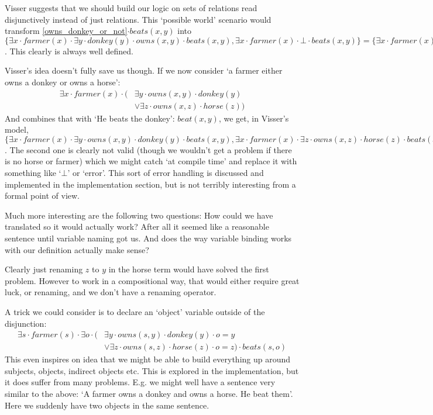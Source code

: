 \documentclass[12pt]{article}
\begin{document}
Visser\cite{visser1999donkey} suggests that we should build our logic on sets of relations read disjunctively instead of just relations. This `possible world' scenario would transform \eqref{owns_donkey_or_not}$\cdot beats(x,y)$ into $\{\exists x\cdot farmer(x)\cdot\exists y\cdot donkey(y)\cdot owns(x,y)\cdot beats(x,y), \exists x\cdot farmer(x)\cdot\bot\cdot beats(x,y)\} = \{\exists x\cdot farmer(x)\cdot\exists y\cdot donkey(y)\cdot owns(x,y)\cdot beats(x,y), \bot\}$. This clearly is always well defined.

Visser's idea doesn't fully save us though. If we now consider `a farmer either owns a donkey or owns a horse':
\begin{align}
\exists x\cdot farmer(x)\cdot(&\exists y\cdot owns(x,y)\cdot donkey(y)\nonumber\\
                              &\vee \exists z\cdot owns(x,z)\cdot horse(z))
\end{align}
And combines that with `He beats the donkey': $beat(x,y)$, we get, in Visser's model, $\{\exists x\cdot farmer(x)\cdot\exists y\cdot owns(x,y)\cdot donkey(y)\cdot beats(x,y), \exists x\cdot farmer(x)\cdot\exists z\cdot owns(x,z)\cdot horse(z)\cdot beats(x,y)\}$. The second one is clearly not valid (though we wouldn't get a problem if there is no horse or farmer) which we might catch `at compile time' and replace it with something like `$\bot$' or `error'. This sort of error handling is discussed and implemented in the implementation section, but is not terribly interesting from a formal point of view.

Much more interesting are the following two questions: How could we have translated \label{owns_donkey_or_horse} so it would actually work? After all it seemed like a reasonable sentence until variable naming got us. And does the way variable binding works with our definition actually make sense?

Clearly just renaming $z$ to $y$ in the horse term would have solved the first problem. However to work in a compositional way, that would either require great luck, or renaming, and we don't have a renaming operator.

A trick we could consider is to declare an `object' variable outside of the disjunction:
\begin{align}
\exists s\cdot farmer(s)\cdot\exists o\cdot(
      &\exists y\cdot owns(s,y)\cdot donkey(y)\cdot o=y \nonumber\\
      &\vee \exists z\cdot owns(s,z)\cdot horse(z)\cdot o=z)\cdot beats(s,o)
\end{align}
%
This even inspires on idea that we might be able to build everything up around subjects, objects, indirect objects etc. This is explored in the implementation, but it does suffer from many problems. E.g. we might well have a sentence very similar to the above: `A farmer owns a donkey and owns a horse. He beat them'. Here we suddenly have two objects in the same sentence.
\end{document}
